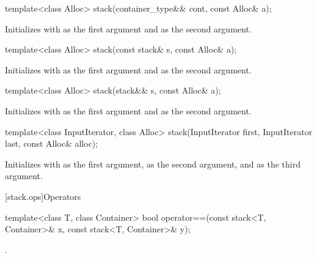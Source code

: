 %
\begin{itemdecl}
template<class Alloc> stack(container_type&& cont, const Alloc& a);
\end{itemdecl}

\begin{itemdescr}
\pnum
\effects
Initializes  with  as the first argument and 
as the second argument.
\end{itemdescr}

%
\begin{itemdecl}
template<class Alloc> stack(const stack& s, const Alloc& a);
\end{itemdecl}

\begin{itemdescr}
\pnum
\effects
Initializes  with  as the first argument and 
as the second argument.
\end{itemdescr}

%
\begin{itemdecl}
template<class Alloc> stack(stack&& s, const Alloc& a);
\end{itemdecl}

\begin{itemdescr}
\pnum
\effects
Initializes  with  as the first argument and 
as the second argument.
\end{itemdescr}

%
\begin{itemdecl}
template<class InputIterator, class Alloc>
  stack(InputIterator first, InputIterator last, const Alloc& alloc);
\end{itemdecl}

\begin{itemdescr}
\pnum
\effects
Initializes  with
 as the first argument,
 as the second argument, and
 as the third argument.
\end{itemdescr}

[stack.ops]{Operators}

%
\begin{itemdecl}
template<class T, class Container>
  bool operator==(const stack<T, Container>& x, const stack<T, Container>& y);
\end{itemdecl}

\begin{itemdescr}
\pnum
\returns
{}.
\end{itemdescr}

